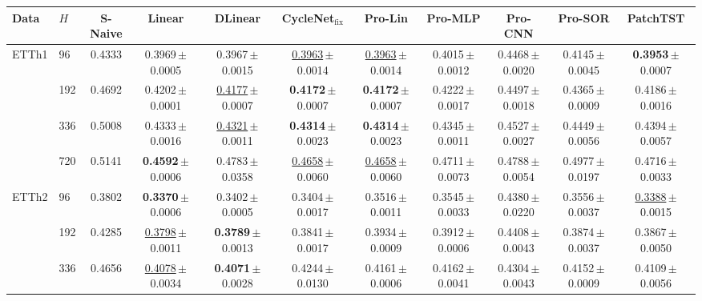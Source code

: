 \begin{tabular}{llccccccccc}
\toprule
\textbf{Data} & $H$ & \textbf{S-Naive} & \textbf{Linear} & \textbf{DLinear} & \textbf{CycleNet$_{\text{fix}}$} & \textbf{Pro-Lin} & \textbf{Pro-MLP} & \textbf{Pro-CNN} & \textbf{Pro-SOR} & \textbf{PatchTST} \\
\midrule
\multirow{4}{*}{ETTh1} & 96 & 0.4333 & 0.3969\,{\tiny$\pm$0.0005} & 0.3967\,{\tiny$\pm$0.0015} & \underline{0.3963}\,{\tiny$\pm$0.0014} & \underline{0.3963}\,{\tiny$\pm$0.0014} & 0.4015\,{\tiny$\pm$0.0012} & 0.4468\,{\tiny$\pm$0.0020} & 0.4145\,{\tiny$\pm$0.0045} & \textbf{0.3953}\,{\tiny$\pm$0.0007} \\
 & 192 & 0.4692 & 0.4202\,{\tiny$\pm$0.0001} & \underline{0.4177}\,{\tiny$\pm$0.0007} & \textbf{0.4172}\,{\tiny$\pm$0.0007} & \textbf{0.4172}\,{\tiny$\pm$0.0007} & 0.4222\,{\tiny$\pm$0.0017} & 0.4497\,{\tiny$\pm$0.0018} & 0.4365\,{\tiny$\pm$0.0009} & 0.4186\,{\tiny$\pm$0.0016} \\
 & 336 & 0.5008 & 0.4333\,{\tiny$\pm$0.0016} & \underline{0.4321}\,{\tiny$\pm$0.0011} & \textbf{0.4314}\,{\tiny$\pm$0.0023} & \textbf{0.4314}\,{\tiny$\pm$0.0023} & 0.4345\,{\tiny$\pm$0.0011} & 0.4527\,{\tiny$\pm$0.0027} & 0.4449\,{\tiny$\pm$0.0056} & 0.4394\,{\tiny$\pm$0.0057} \\
 & 720 & 0.5141 & \textbf{0.4592}\,{\tiny$\pm$0.0006} & 0.4783\,{\tiny$\pm$0.0358} & \underline{0.4658}\,{\tiny$\pm$0.0060} & \underline{0.4658}\,{\tiny$\pm$0.0060} & 0.4711\,{\tiny$\pm$0.0073} & 0.4788\,{\tiny$\pm$0.0054} & 0.4977\,{\tiny$\pm$0.0197} & 0.4716\,{\tiny$\pm$0.0033} \\
\midrule
\multirow{4}{*}{ETTh2} & 96 & 0.3802 & \textbf{0.3370}\,{\tiny$\pm$0.0006} & 0.3402\,{\tiny$\pm$0.0005} & 0.3404\,{\tiny$\pm$0.0017} & 0.3516\,{\tiny$\pm$0.0011} & 0.3545\,{\tiny$\pm$0.0033} & 0.4380\,{\tiny$\pm$0.0220} & 0.3556\,{\tiny$\pm$0.0037} & \underline{0.3388}\,{\tiny$\pm$0.0015} \\
 & 192 & 0.4285 & \underline{0.3798}\,{\tiny$\pm$0.0011} & \textbf{0.3789}\,{\tiny$\pm$0.0013} & 0.3841\,{\tiny$\pm$0.0017} & 0.3934\,{\tiny$\pm$0.0009} & 0.3912\,{\tiny$\pm$0.0006} & 0.4408\,{\tiny$\pm$0.0043} & 0.3874\,{\tiny$\pm$0.0037} & 0.3867\,{\tiny$\pm$0.0050} \\
 & 336 & 0.4656 & \underline{0.4078}\,{\tiny$\pm$0.0034} & \textbf{0.4071}\,{\tiny$\pm$0.0028} & 0.4244\,{\tiny$\pm$0.0130} & 0.4161\,{\tiny$\pm$0.0006} & 0.4162\,{\tiny$\pm$0.0041} & 0.4304\,{\tiny$\pm$0.0043} & 0.4152\,{\tiny$\pm$0.0009} & 0.4109\,{\tiny$\pm$0.0056} \\

\end{tabular}
